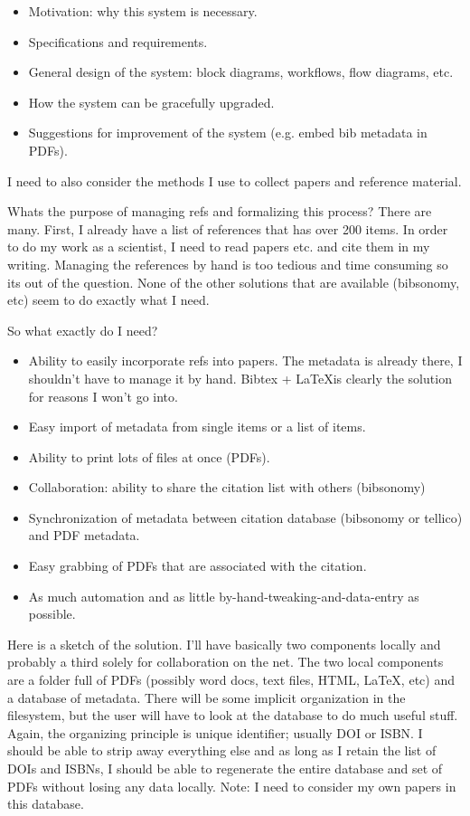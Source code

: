 \documentclass[letterpaper,12pt]{article}
\begin{document}
\begin{itemize}
\item Motivation: why this system is necessary.
\item Specifications and requirements.
\item General design of the system: block diagrams, workflows, flow diagrams, etc.
\item How the system can be gracefully upgraded.
\item Suggestions for improvement of the system (e.g. embed bib metadata in PDFs).
\end{itemize}

I need to also consider the methods I use to collect papers and reference material.

Whats the purpose of managing refs and formalizing this process? There are many. First, I already have a list of references that has over 200 items. In order to do my work as a scientist, I need to read papers etc. and cite them in my writing. Managing the references by hand is too tedious and time consuming so its out of the question. None of the other solutions that are available (bibsonomy, etc) seem to do exactly what I need.

So what exactly do I need?

\begin{itemize}
\item Ability to easily incorporate refs into papers. The metadata is already there, I shouldn't have to manage it by hand. Bibtex + \LaTeX is clearly the solution for reasons I won't go into.
\item Easy import of metadata from single items or a list of items.
\item Ability to print lots of files at once (PDFs).
\item Collaboration: ability to share the citation list with others (bibsonomy)
\item Synchronization of metadata between citation database (bibsonomy or tellico) and PDF metadata.
\item Easy grabbing of PDFs that are associated with the citation. 
\item As much automation and as little by-hand-tweaking-and-data-entry as possible.
\end{itemize}

Here is a sketch of the solution.
I'll have basically two components locally and probably a third solely for collaboration on the net. The two local components are a folder full of PDFs (possibly word docs, text files, HTML, \LaTeX, etc) and a database of metadata. There will be some implicit organization in the filesystem, but the user will have to look at the database to do much useful stuff. Again, the organizing principle is unique identifier; usually DOI or ISBN. I should be able to strip away everything else and as long as I retain the list of DOIs and ISBNs, I should be able to regenerate the entire database and set of PDFs without losing any data locally. Note: I need to consider my own papers in this database.
\end{document}
